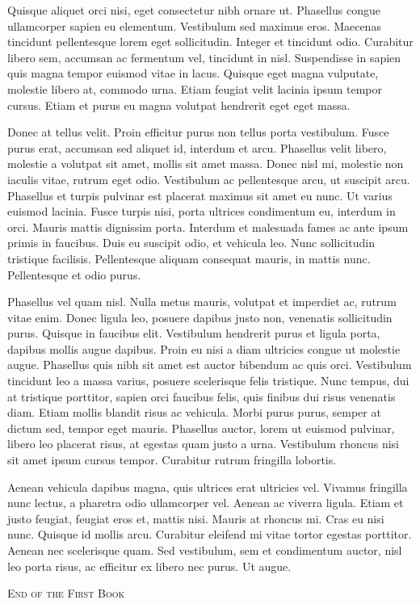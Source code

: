 \documentclass{amsbook}
\begin{document}
Quisque aliquet orci nisi, eget consectetur nibh ornare ut. Phasellus congue ullamcorper sapien eu elementum. Vestibulum sed maximus eros. Maecenas tincidunt pellentesque lorem eget sollicitudin. Integer et tincidunt odio. Curabitur libero sem, accumsan ac fermentum vel, tincidunt in nisl. Suspendisse in sapien quis magna tempor euismod vitae in lacus. Quisque eget magna vulputate, molestie libero at, commodo urna. Etiam feugiat velit lacinia ipsum tempor cursus. Etiam et purus eu magna volutpat hendrerit eget eget massa.

Donec at tellus velit. Proin efficitur purus non tellus porta vestibulum. Fusce purus erat, accumsan sed aliquet id, interdum et arcu. Phasellus velit libero, molestie a volutpat sit amet, mollis sit amet massa. Donec nisl mi, molestie non iaculis vitae, rutrum eget odio. Vestibulum ac pellentesque arcu, ut suscipit arcu. Phasellus et turpis pulvinar est placerat maximus sit amet eu nunc. Ut varius euismod lacinia. Fusce turpis nisi, porta ultrices condimentum eu, interdum in orci. Mauris mattis dignissim porta. Interdum et malesuada fames ac ante ipsum primis in faucibus. Duis eu suscipit odio, et vehicula leo. Nunc sollicitudin tristique facilisis. Pellentesque aliquam consequat mauris, in mattis nunc. Pellentesque et odio purus.

Phasellus vel quam nisl. Nulla metus mauris, volutpat et imperdiet ac, rutrum vitae enim. Donec ligula leo, posuere dapibus justo non, venenatis sollicitudin purus. Quisque in faucibus elit. Vestibulum hendrerit purus et ligula porta, dapibus mollis augue dapibus. Proin eu nisi a diam ultricies congue ut molestie augue. Phasellus quis nibh sit amet est auctor bibendum ac quis orci. Vestibulum tincidunt leo a massa varius, posuere scelerisque felis tristique. Nunc tempus, dui at tristique porttitor, sapien orci faucibus felis, quis finibus dui risus venenatis diam. Etiam mollis blandit risus ac vehicula. Morbi purus purus, semper at dictum sed, tempor eget mauris. Phasellus auctor, lorem ut euismod pulvinar, libero leo placerat risus, at egestas quam justo a urna. Vestibulum rhoncus nisi sit amet ipsum cursus tempor. Curabitur rutrum fringilla lobortis.

Aenean vehicula dapibus magna, quis ultrices erat ultricies vel. Vivamus fringilla nunc lectus, a pharetra odio ullamcorper vel. Aenean ac viverra ligula. Etiam et justo feugiat, feugiat eros et, mattis nisi. Mauris at rhoncus mi. Cras eu nisi nunc. Quisque id mollis arcu. Curabitur eleifend mi vitae tortor egestas porttitor. Aenean nec scelerisque quam. Sed vestibulum, sem et condimentum auctor, nisl leo porta risus, ac efficitur ex libero nec purus. Ut augue.


\bigskip
\bigskip
\begin{center}
    \textsc{End of the First Book}
\end{center}
\end{document}
